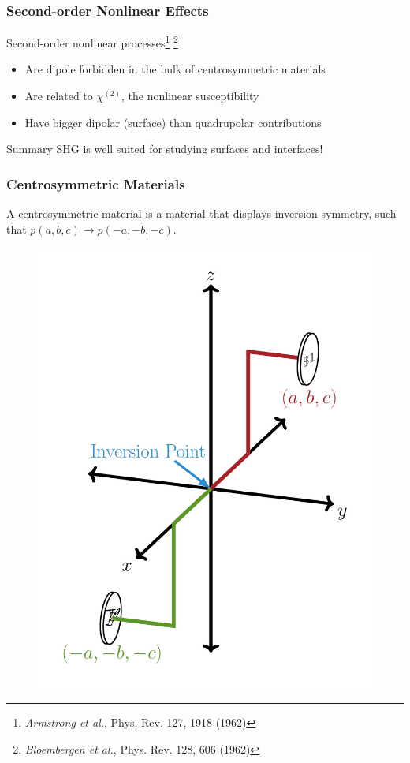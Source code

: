 \documentclass{beamer}
\begin{document}
\begin{frame}
\frametitle{Second-order Nonlinear Effects}
Second-order nonlinear processes\footnote{\emph{Armstrong et al.}, Phys. Rev.
127, 1918 (1962)}
\footnote{\emph{Bloembergen et al.}, Phys. Rev. 128, 606 (1962)}
\begin{itemize}
\item Are dipole forbidden in the bulk of centrosymmetric materials
\item Are related to $\chi^{(2)}$, the nonlinear susceptibility
\item Have bigger dipolar (surface) than quadrupolar contributions
\end{itemize}\vfill
\begin{block}{Summary}
SHG is well suited for studying surfaces and interfaces!
\end{block}
\end{frame}

\begin{frame}
\frametitle{Centrosymmetric Materials}
A centrosymmetric material is a material that displays inversion symmetry, such
that $p(a,b,c) \rightarrow p(-a,-b,-c)$.
\begin{figure}
\centering
\includegraphics[height=0.7\textheight]{diag-centrosymmetry}
\end{figure}
\end{frame}
\end{document}
